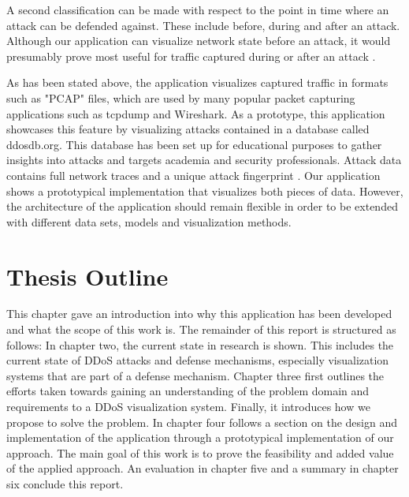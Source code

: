 A second classification can be made with respect to the point in time where an attack can be defended against. These include before, during and after an attack.
Although our application can visualize network state before an attack, it would presumably prove most useful for traffic captured during or after an attack \cite{zargar}.

As has been stated above, the application visualizes captured traffic in formats such as "PCAP" files, which are used by many popular packet capturing applications such as tcpdump and Wireshark. As a prototype, this application showcases this feature by visualizing attacks contained in a database called ddosdb.org. This database has been set up for educational purposes to gather insights into attacks and targets academia and security professionals. Attack data contains full network traces and a unique attack fingerprint \cite{ddosdb-help}. Our application shows a prototypical implementation that visualizes both pieces of data. However, the architecture of the application should remain flexible in order to be extended with different data sets, models and visualization methods.

\section{Thesis Outline}

This chapter gave an introduction into why this application has been developed and what the scope of this work is. The remainder of this report is structured as follows: In chapter two, the current state in research is shown. This includes the current state of DDoS attacks and defense mechanisms, especially visualization systems that are part of a defense mechanism. Chapter three first outlines the efforts taken towards gaining an understanding of the problem domain and requirements to a DDoS visualization system. Finally, it introduces how we propose to solve the problem. In chapter four follows a section on the design and implementation of the application through a prototypical implementation of our approach. The main goal of this work is to prove the feasibility and added value of the applied approach. An evaluation in chapter five and a summary in chapter six conclude this report.